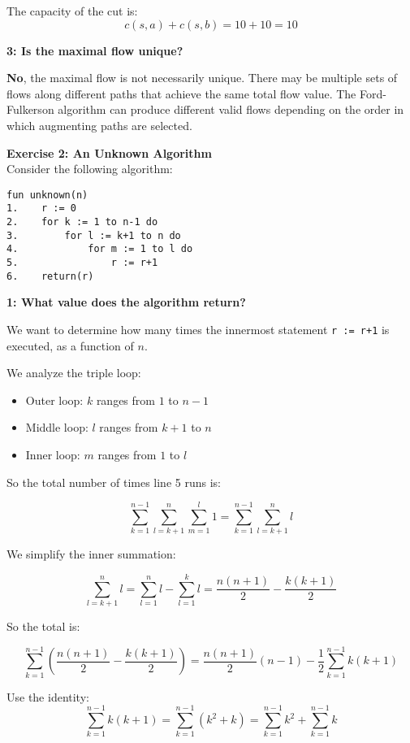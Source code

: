\documentclass{article}
\theoremstyle{theorem}
\theoremstyle{definition}
\theoremstyle{remark}
\begin{document}
The capacity of the cut is:
\[
c(s,a) + c(s,b) = 10 + 10 = \boxed{10}
\]

\vspace{0.5em}

\textbf{3: Is the maximal flow unique?}

\textbf{No}, the maximal flow is not necessarily unique. There may be multiple sets of flows along different paths that achieve the same total flow value. The Ford-Fulkerson algorithm can produce different valid flows depending on the order in which augmenting paths are selected.

\textbf{Exercise 2: An Unknown Algorithm}\\
Consider the following algorithm:

\begin{verbatim}
fun unknown(n)
1.    r := 0
2.    for k := 1 to n-1 do
3.        for l := k+1 to n do
4.            for m := 1 to l do
5.                r := r+1
6.    return(r)
\end{verbatim}

\textbf{1: What value does the algorithm return?}

We want to determine how many times the innermost statement \texttt{r := r+1} is executed, as a function of $n$.

We analyze the triple loop:

\begin{itemize}
    \item Outer loop: $k$ ranges from $1$ to $n-1$
    \item Middle loop: $l$ ranges from $k+1$ to $n$
    \item Inner loop: $m$ ranges from $1$ to $l$
\end{itemize}

So the total number of times line 5 runs is:

\[
\sum_{k=1}^{n-1} \sum_{l=k+1}^{n} \sum_{m=1}^{l} 1 = \sum_{k=1}^{n-1} \sum_{l=k+1}^{n} l
\]

We simplify the inner summation:

\[
\sum_{l=k+1}^{n} l = \sum_{l=1}^{n} l - \sum_{l=1}^{k} l = \frac{n(n+1)}{2} - \frac{k(k+1)}{2}
\]

So the total is:

\[
\sum_{k=1}^{n-1} \left( \frac{n(n+1)}{2} - \frac{k(k+1)}{2} \right)
= \frac{n(n+1)}{2}(n-1) - \frac{1}{2} \sum_{k=1}^{n-1} k(k+1)
\]

Use the identity:
\[
\sum_{k=1}^{n-1} k(k+1) = \sum_{k=1}^{n-1} (k^2 + k) = \sum_{k=1}^{n-1} k^2 + \sum_{k=1}^{n-1} k
\]
\end{document}
